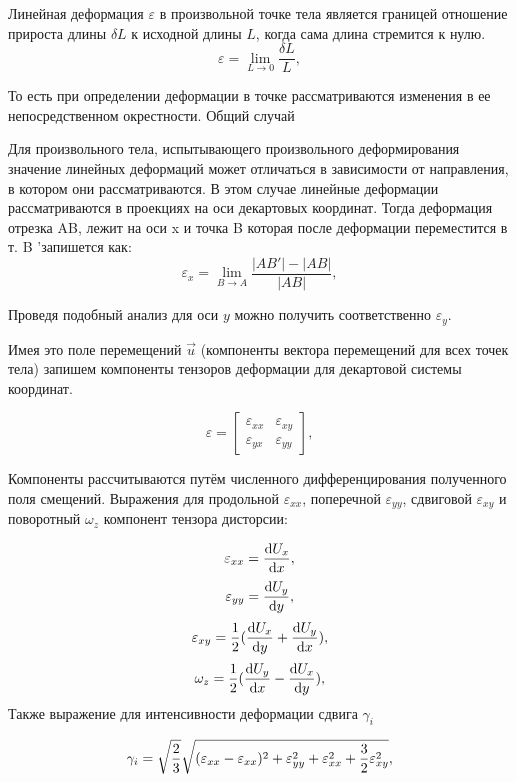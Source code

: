 Линейная деформация $\varepsilon$ в произвольной точке тела является границей отношение прироста длины $\delta L$ к исходной длины $L$, когда сама длина стремится к нулю.
\[ \varepsilon = \lim_{L \to 0} \frac{{\delta} {L}} {L},\]

То есть при определении деформации в точке рассматриваются изменения в ее непосредственном окрестности.
Общий случай

Для произвольного тела, испытывающего произвольного деформирования значение линейных деформаций может отличаться в зависимости от направления, в котором они рассматриваются. В этом случае линейные деформации рассматриваются в проекциях на оси декартовых координат. Тогда деформация отрезка AB, лежит на оси x и точка B которая после деформации переместится в т. B 'запишется как:
\[ \varepsilon_x = \lim_{B \to A} {\frac{| AB '| - | AB |}{| AB |}} ,\]

Проведя подобный анализ для оси $y$ можно получить соответственно $\varepsilon_y$.

Имея это поле перемещений $\overrightarrow u$ (компоненты вектора перемещений для всех точек тела) запишем компоненты тензоров деформации для декартовой системы координат.

\[ \varepsilon = \left [{\begin {matrix} 
{\varepsilon_{xx}} & {\varepsilon_{xy}} \\ 
{\varepsilon_{yx}} & {\varepsilon_{yy}} 
\end{matrix}} \right] ,\]

Компоненты рассчитываются путём численного дифференцирования полученного поля смещений. Выражения для продольной $\varepsilon_{xx}$, поперечной $\varepsilon_{yy}$, сдвиговой $\varepsilon_{xy}$ и поворотный $\omega_z$ компонент тензора дисторсии:

\begin{equation}
\numberwithin{equation}{section}
\label{eq:e_xx}
\varepsilon_{xx}= \frac{\mathrm{d} U_x}{\mathrm{d} x},
\end{equation}
\begin{equation}
\numberwithin{equation}{section}
\label{eq:e_yy}
\varepsilon_{yy}= \frac{\mathrm{d} U_y}{\mathrm{d} y},
\end{equation}
\begin{equation}
\numberwithin{equation}{section}
\label{eq:e_xy}
\varepsilon_{xy}=\frac{1}{2}(\frac{\mathrm{d} U_x}{\mathrm{d} y} + \frac{\mathrm{d} U_y}{\mathrm{d} x}),
\end{equation}
\begin{equation}
\numberwithin{equation}{section}
\label{eq:w_z}
\omega_z=\frac{1}{2}(\frac{\mathrm{d} U_y}{\mathrm{d} x} - \frac{\mathrm{d} U_x}{\mathrm{d} y}),
\end{equation}
Также выражение для интенсивности деформации сдвига $\gamma_i$

\begin{equation}
\numberwithin{equation}{section}
\label{eq:gamma_i}
\gamma_i = \sqrt\frac{2}{3}\sqrt{(\varepsilon_{xx}-\varepsilon_{xx})^2+\varepsilon_{yy}^2+\varepsilon_{xx}^2 + \frac{3}{2}\varepsilon_{xy}^2},
\end{equation}